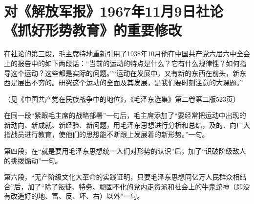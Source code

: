 \section[对《解放军报》1967年11月9日社论《抓好形势教育》的重要修改（一九六七年十一月）]{对《解放军报》1967年11月9日社论《抓好形势教育》的重要修改}


在社论的第三段，毛主席特地重新引用了1938年10月他在中国共产党六届六中全会上的报告中的如下两段话：“当前的运动的特点是什么？它有什么规律性？如何指导这个运动？这些都是实际的问题。”“运动在发展中，又有新的东西在前头，新东西是层出不穷的。研究这个运动的全面及其发展，是我们要时刻注意的大课题。”

（见《中国共产党在民族战争中的地位》，《毛泽东选集》第二卷第二版523页）

在同一段“紧跟毛主席的战略部署”一句后，毛主席添加了“要经常把运动中出现的新动向、新成就、新经验、新问题，用毛泽东思想进行分析和总结，及的．向广大指战员进行教育，使他们的思想能不断跟上发展着的新形势。”一句。

第四段，在“就是要用毛泽东思想统一人们对形势的认识”后，加了“识破阶级敌人的挑拨煽动”一句。

第六段，“无产阶级文化大革命的实践证明，只要毛泽东思想同亿万人民群众相结合”后，加了“除了叛徒、特务、顽固不化的党内走资派和社会上的牛鬼蛇神（即没有改造好的地、富、反、坏、右）以外”一句。


